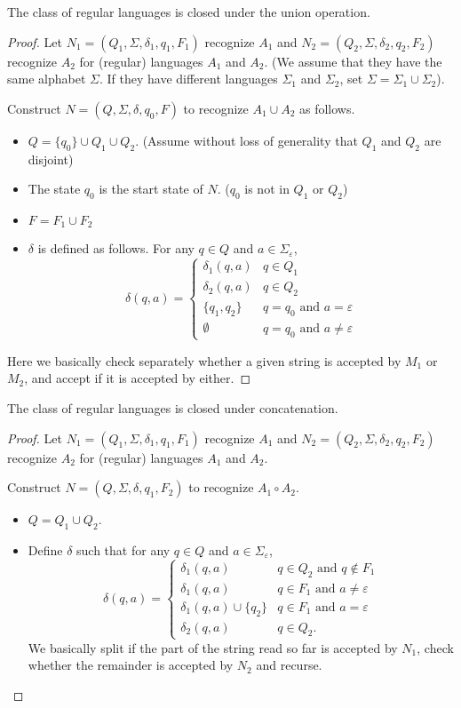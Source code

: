 \begin{theorem}
The class of regular languages is closed under the union operation.
\end{theorem}
\begin{proof}
Let $N_1=(Q_1,\Sigma,\delta_1,q_1,F_1)$ recognize $A_1$ and $N_2=(Q_2,\Sigma,\delta_2,q_2,F_2)$ recognize $A_2$ for (regular) languages $A_1$ and $A_2$. (We assume that they have the same alphabet $\Sigma$. If they have different languages $\Sigma_1$ and $\Sigma_2$, set $\Sigma=\Sigma_1\cup\Sigma_2$).

Construct $N=(Q,\Sigma,\delta,q_0,F)$ to recognize $A_1\cup A_2$ as follows.
\begin{itemize}
    \item $Q=\{q_0\}\cup Q_1\cup Q_2$. (Assume without loss of generality that $Q_1$ and $Q_2$ are disjoint)
    \item The state $q_0$ is the start state of $N$. ($q_0$ is not in $Q_1$ or $Q_2$)
    \item $F=F_1\cup F_2$
    \item $\delta$ is defined as follows. For any $q\in Q$ and $a\in\Sigma_\varepsilon$,
    $$
    \delta(q,a)=
    \begin{cases}
    \delta_1(q,a) & q\in Q_1 \\
    \delta_2(q,a) & q\in Q_2 \\
    \{q_1,q_2\} & q=q_0\text{ and }a=\varepsilon \\
    \emptyset & q=q_0\text{ and }a\neq\varepsilon
    \end{cases}
    $$
\end{itemize}
Here we basically check separately whether a given string is accepted by $M_1$ or $M_2$, and accept if it is accepted by either.
\end{proof}

\begin{theorem}
The class of regular languages is closed under concatenation.
\end{theorem}
\begin{proof}
Let $N_1=(Q_1,\Sigma,\delta_1,q_1,F_1)$ recognize $A_1$ and $N_2=(Q_2,\Sigma,\delta_2,q_2,F_2)$ recognize $A_2$ for (regular) languages $A_1$ and $A_2$.

Construct $N=(Q,\Sigma,\delta,q_1,F_2)$ to recognize $A_1\circ A_2$.
\begin{itemize}
    \item $Q=Q_1\cup Q_2$.
    \item Define $\delta$ such that for any $q\in Q$ and $a\in\Sigma_\varepsilon$,
    $$
    \delta(q,a)=
    \begin{cases}
    \delta_1(q,a) & q\in Q_2\text{ and }q\not\in F_1 \\
    \delta_1(q,a) & q\in F_1\text{ and }a\neq\varepsilon \\
    \delta_1(q,a)\cup \{q_2\} & q\in F_1\text{ and }a=\varepsilon \\
    \delta_2(q,a) & q\in Q_2.
    \end{cases}
    $$
    We basically split if the part of the string read so far is accepted by $N_1$, check whether the remainder is accepted by $N_2$ and recurse.
\end{itemize}
\end{proof}

